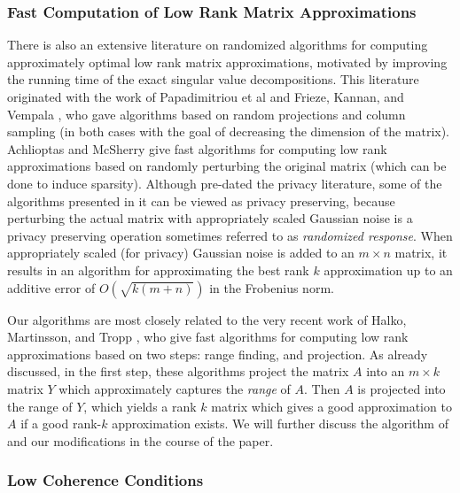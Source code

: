 \documentclass[letterpaper,11pt]{article}
\theoremstyle{definition}
\begin{document}
\subsubsection{Fast Computation of Low Rank Matrix Approximations}
There is also an extensive literature on randomized algorithms for computing
approximately optimal low rank matrix approximations, motivated by improving
the running time of the exact singular value decompositions. This literature
originated with the work of Papadimitriou et al \cite{PapadimitriouTRV98} and Frieze,
Kannan, and Vempala \cite{FriezeKV04}, who gave algorithms based on random
projections and column sampling (in both cases with the goal of decreasing the
dimension of the matrix). Achlioptas and McSherry \cite{AchlioptasM01} give fast
algorithms for computing low rank approximations based on randomly perturbing
the original matrix (which can be done to induce sparsity). Although
\cite{AchlioptasM01} pre-dated the privacy literature, some of the algorithms presented
in it can be viewed as privacy preserving, because perturbing the actual
matrix with appropriately scaled Gaussian noise is a privacy preserving
operation sometimes referred to as \emph{randomized response}. When
appropriately scaled (for privacy) Gaussian noise is added to an $m\times n$
matrix, it results in an algorithm for approximating the best rank $k$
approximation up to an additive error of $O(\sqrt{k(m+n)})$ in the Frobenius
norm.


Our algorithms are most closely related to  the very recent work of Halko,
Martinsson, and Tropp \cite{HalkoMT11}, who give fast algorithms for computing
low rank approximations based on two steps: range finding, and projection. As
already discussed, in the first step, these algorithms project the matrix $A$
into an $m\times k$ matrix $Y$ which approximately captures the \emph{range}
of $A$. Then $A$ is projected into the range of $Y$, which yields a rank $k$
matrix which gives a good approximation to $A$ if a good rank-$k$
approximation exists. We will further discuss the algorithm of
\cite{HalkoMT11} and our modifications in the course of the paper.



\subsubsection{Low Coherence Conditions}
\end{document}
